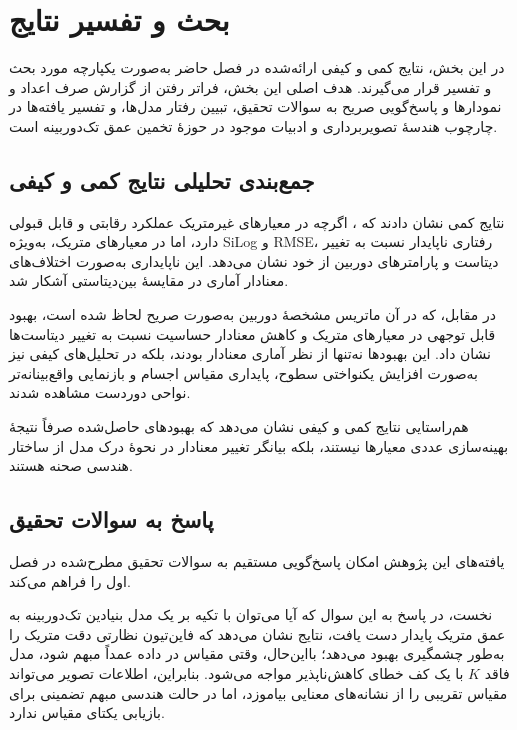 \section{بحث و تفسیر نتایج}
\label{sec:discussion}

در این بخش، نتایج کمی و کیفی ارائه‌شده در فصل حاضر
به‌صورت یکپارچه مورد بحث و تفسیر قرار می‌گیرند.
هدف اصلی این بخش،
فراتر رفتن از گزارش صرف اعداد و نمودارها
و پاسخ‌گویی صریح به سوالات تحقیق،
تبیین رفتار مدل‌ها،
و تفسیر یافته‌ها در چارچوب هندسهٔ تصویربرداری
و ادبیات موجود در حوزهٔ تخمین عمق تک‌دوربینه است.

\subsection{جمع‌بندی تحلیلی نتایج کمی و کیفی}
\label{subsec:quantitative_qualitative_summary}

نتایج کمی نشان دادند که
\basemodel{}،
اگرچه در معیارهای غیرمتریک
عملکرد رقابتی و قابل قبولی دارد،
اما در معیارهای متریک،
به‌ویژه SiLog و RMSE،
رفتاری ناپایدار نسبت به تغییر دیتاست
و پارامترهای دوربین از خود نشان می‌دهد.
این ناپایداری به‌صورت اختلاف‌های معنادار آماری
در مقایسهٔ بین‌دیتاستی آشکار شد.

در مقابل،
\proposedmodel{} که در آن
ماتریس مشخصهٔ دوربین به‌صورت صریح لحاظ شده است،
بهبود قابل توجهی در معیارهای متریک
و کاهش معنادار حساسیت نسبت به تغییر دیتاست‌ها
نشان داد.
این بهبودها نه‌تنها از نظر آماری معنادار بودند،
بلکه در تحلیل‌های کیفی نیز
به‌صورت افزایش یکنواختی سطوح،
پایداری مقیاس اجسام
و بازنمایی واقع‌بینانه‌تر نواحی دوردست مشاهده شدند.

هم‌راستایی نتایج کمی و کیفی
نشان می‌دهد که
بهبودهای حاصل‌شده
صرفاً نتیجهٔ بهینه‌سازی عددی معیارها نیستند،
بلکه بیانگر تغییر معنادار
در نحوهٔ درک مدل از ساختار هندسی صحنه هستند.

\subsection{پاسخ به سوالات تحقیق}
\label{subsec:research_questions_answers}

یافته‌های این پژوهش امکان پاسخ‌گویی مستقیم
به سوالات تحقیق مطرح‌شده در فصل اول را فراهم می‌کند.

نخست،
در پاسخ به این سوال که
آیا می‌توان با تکیه بر یک مدل بنیادین تک‌دوربینه
به عمق متریک پایدار دست یافت،
نتایج نشان می‌دهد که فاین‌تیون نظارتی \basemodel{}
دقت متریک را به‌طور چشمگیری بهبود می‌دهد؛ بااین‌حال،
وقتی مقیاس در داده عمداً مبهم شود، مدل فاقد $K$
با یک کف خطای کاهش‌ناپذیر مواجه می‌شود. بنابراین،
اطلاعات تصویر می‌تواند مقیاس تقریبی را از نشانه‌های معنایی بیاموزد،
اما در حالت هندسی مبهم تضمینی برای بازیابی یکتای مقیاس ندارد.

